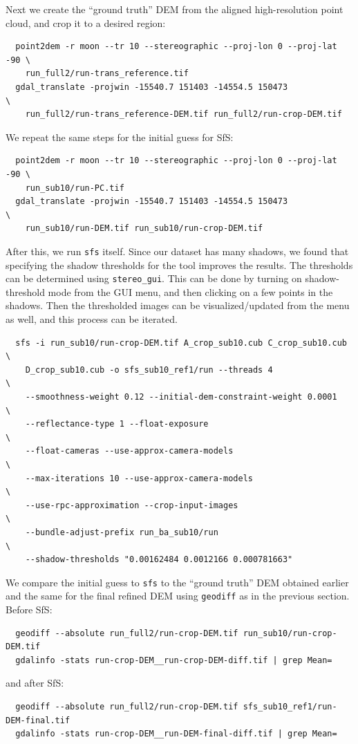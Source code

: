 Next we create the ``ground truth'' DEM from the aligned high-resolution
point cloud, and crop it to a desired region:
\begin{verbatim}
  point2dem -r moon --tr 10 --stereographic --proj-lon 0 --proj-lat -90 \
    run_full2/run-trans_reference.tif
  gdal_translate -projwin -15540.7 151403 -14554.5 150473               \
    run_full2/run-trans_reference-DEM.tif run_full2/run-crop-DEM.tif
\end{verbatim}
We repeat the same steps for the initial guess for SfS:
\begin{verbatim}
  point2dem -r moon --tr 10 --stereographic --proj-lon 0 --proj-lat -90 \
    run_sub10/run-PC.tif
  gdal_translate -projwin -15540.7 151403 -14554.5 150473               \
    run_sub10/run-DEM.tif run_sub10/run-crop-DEM.tif
\end{verbatim}
After this, we run \texttt{sfs} itself. Since our dataset has many shadows, we found
that specifying the shadow thresholds for the tool improves the
results. The thresholds can be determined using \texttt{stereo\_gui}.
This can be done by turning on shadow-threshold mode from the GUI menu, 
and then clicking on a few points in the shadows.  Then the thresholded images
can be visualized/updated from the menu as well, and this process can be iterated.
\begin{verbatim}
  sfs -i run_sub10/run-crop-DEM.tif A_crop_sub10.cub C_crop_sub10.cub \
    D_crop_sub10.cub -o sfs_sub10_ref1/run --threads 4                \
    --smoothness-weight 0.12 --initial-dem-constraint-weight 0.0001   \
    --reflectance-type 1 --float-exposure                             \
    --float-cameras --use-approx-camera-models                        \
    --max-iterations 10 --use-approx-camera-models                    \
    --use-rpc-approximation --crop-input-images                       \
    --bundle-adjust-prefix run_ba_sub10/run                           \
    --shadow-thresholds "0.00162484 0.0012166 0.000781663"
\end{verbatim}
We compare the initial guess to \texttt{sfs} to the ``ground truth'' DEM
obtained earlier and the same for the final refined DEM using
\texttt{geodiff} as in the previous section. Before SfS:

\begin{verbatim}
  geodiff --absolute run_full2/run-crop-DEM.tif run_sub10/run-crop-DEM.tif
  gdalinfo -stats run-crop-DEM__run-crop-DEM-diff.tif | grep Mean=  
\end{verbatim}
and after SfS:
\begin{verbatim}
  geodiff --absolute run_full2/run-crop-DEM.tif sfs_sub10_ref1/run-DEM-final.tif
  gdalinfo -stats run-crop-DEM__run-DEM-final-diff.tif | grep Mean=
\end{verbatim}


